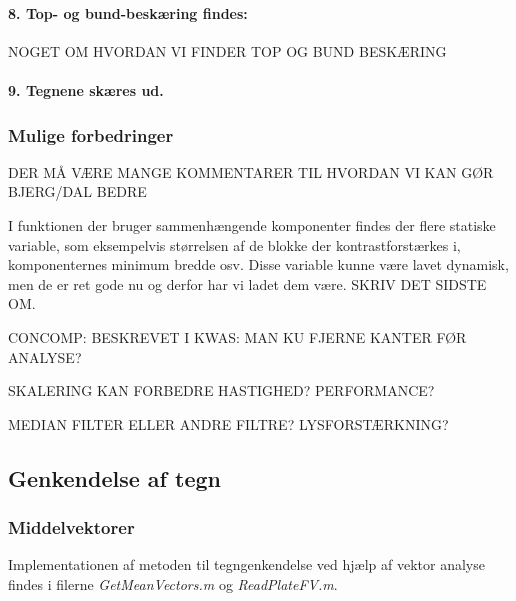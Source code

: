 \paragraph{8. Top- og bund-beskæring findes:}
NOGET OM HVORDAN VI FINDER TOP OG BUND BESKÆRING

\paragraph{9. Tegnene skæres ud.}





\subsubsection{Mulige forbedringer}
DER MÅ VÆRE MANGE KOMMENTARER TIL HVORDAN VI KAN GØR BJERG/DAL BEDRE

I funktionen der bruger sammenhængende komponenter findes der flere statiske variable, som eksempelvis størrelsen af de blokke der kontrastforstærkes i, komponenternes minimum bredde osv. Disse variable kunne være lavet dynamisk, men de er ret gode nu og derfor har vi ladet dem være. SKRIV DET SIDSTE OM.

CONCOMP: BESKREVET I KWAS: MAN KU FJERNE KANTER FØR ANALYSE?

SKALERING KAN FORBEDRE HASTIGHED? PERFORMANCE?

MEDIAN FILTER ELLER ANDRE FILTRE? LYSFORSTÆRKNING?



\subsection{Genkendelse af tegn}

\subsubsection{Middelvektorer}

Implementationen af metoden til tegngenkendelse ved hjælp af vektor analyse findes i filerne \textit{GetMeanVectors.m} og \textit{ReadPlateFV.m}.

